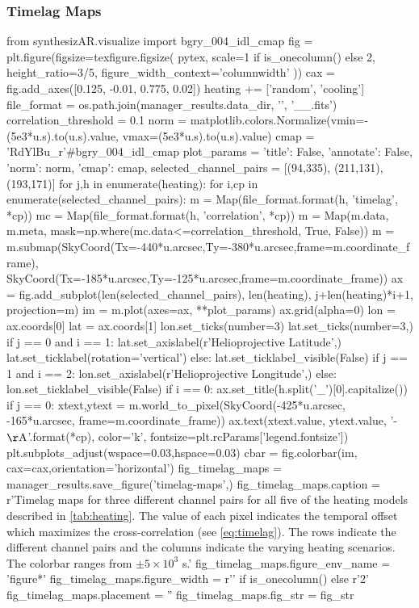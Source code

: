 \subsubsection{Timelag Maps}\label{timelag_maps}

\begin{pycode}
from synthesizAR.visualize import bgry_004_idl_cmap
fig = plt.figure(figsize=texfigure.figsize(
    pytex,
    scale=1 if is_onecolumn() else 2,
    height_ratio=3/5,
    figure_width_context='columnwidth'
))
cax = fig.add_axes([0.125, -0.01, 0.775, 0.02])
heating += ['random', 'cooling']
file_format = os.path.join(manager_results.data_dir, '{}', '{}_{}_{}.fits')
correlation_threshold = 0.1
norm = matplotlib.colors.Normalize(vmin=-(5e3*u.s).to(u.s).value,
                                   vmax=(5e3*u.s).to(u.s).value)
cmap = 'RdYlBu_r'#bgry_004_idl_cmap
plot_params = {'title': False, 'annotate': False, 'norm': norm, 'cmap': cmap,}
selected_channel_pairs = [(94,335), (211,131), (193,171)]
for j,h in enumerate(heating):
    for i,cp in enumerate(selected_channel_pairs):
        m = Map(file_format.format(h, 'timelag', *cp))
        mc = Map(file_format.format(h, 'correlation', *cp))
        m = Map(m.data, m.meta, mask=np.where(mc.data<=correlation_threshold, True, False))
        m = m.submap(SkyCoord(Tx=-440*u.arcsec,Ty=-380*u.arcsec,frame=m.coordinate_frame),
                     SkyCoord(Tx=-185*u.arcsec,Ty=-125*u.arcsec,frame=m.coordinate_frame))
        ax = fig.add_subplot(len(selected_channel_pairs), len(heating), j+len(heating)*i+1,
                             projection=m)
        im = m.plot(axes=ax, **plot_params)
        ax.grid(alpha=0)
        lon = ax.coords[0]
        lat = ax.coords[1]
        lon.set_ticks(number=3)
        lat.set_ticks(number=3,) 
        if j == 0 and i == 1:
            lat.set_axislabel(r'Helioprojective Latitude',)
            lat.set_ticklabel(rotation='vertical')
        else:
            lat.set_ticklabel_visible(False)
        if j == 1 and i == 2:
            lon.set_axislabel(r'Helioprojective Longitude',)
        else:
            lon.set_ticklabel_visible(False)
        if i == 0:
            ax.set_title(h.split('_')[0].capitalize())
        if j == 0:
            xtext,ytext = m.world_to_pixel(SkyCoord(-425*u.arcsec, -165*u.arcsec, frame=m.coordinate_frame))
            ax.text(xtext.value, ytext.value, '{}-{} $\mathrm{{\AA}}$'.format(*cp),
                    color='k', fontsize=plt.rcParams['legend.fontsize'])
plt.subplots_adjust(wspace=0.03,hspace=0.03)
cbar = fig.colorbar(im, cax=cax,orientation='horizontal')
fig_timelag_maps = manager_results.save_figure('timelag-maps',)
fig_timelag_maps.caption = r'Timelag maps for three different channel pairs for all five of the heating models described in \autoref{tab:heating}. The value of each pixel indicates the temporal offset which maximizes the cross-correlation (see \autoref{eq:timelag}). The rows indicate the different channel pairs and the columns indicate the varying heating scenarios. The colorbar ranges from $\pm5\times10^3$ s.'
fig_timelag_maps.figure_env_name = 'figure*'
fig_timelag_maps.figure_width = r'\columnwidth' if is_onecolumn() else r'2\columnwidth'
fig_timelag_maps.placement = ''
fig_timelag_maps.fig_str = fig_str
\end{pycode}
